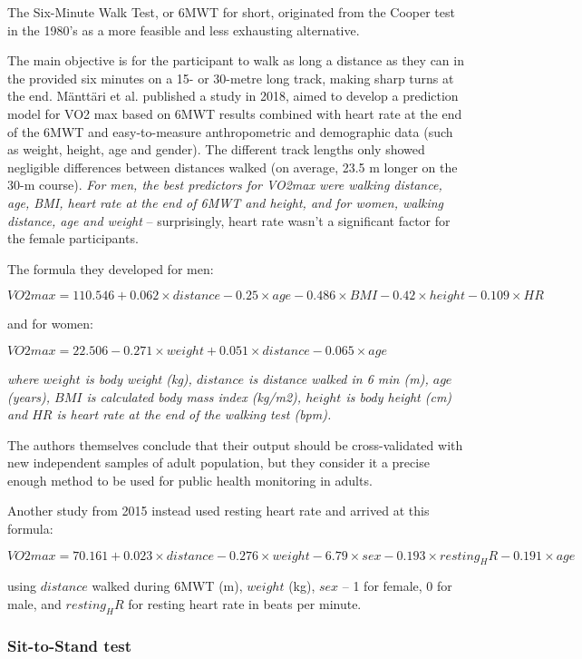 The Six-Minute Walk Test, or 6MWT for short, originated from the Cooper test in the 1980's as a more feasible and less exhausting alternative.\cite{6mwt-history}

The main objective is for the participant to walk as long a distance as they can in the provided six minutes on a 15- or 30-metre long track, making sharp turns at the end.
Mänttäri et al. published a study in 2018\cite{6min-walk-test-mantarri}, aimed to develop a prediction model for VO2 max based on 6MWT results combined with heart rate at the end of the 6MWT and easy-to-measure anthropometric and demographic data (such as weight, height, age and gender).
The different track lengths only showed negligible differences between distances walked (on average, 23.5 m longer on the 30-m course).
\textit{For men, the best predictors for VO2max were walking distance, age, BMI, heart rate at the end of 6MWT and height, and for women, walking distance, age and weight} -- surprisingly, heart rate wasn't a significant factor for the female participants.

The formula they developed for men:

 $VO2 max=110.546 + 0.062\times distance - 0.25\times age - 0.486\times BMI - 0.42\times height - 0.109\times HR$

 and for women:

 $VO2 max=22.506 - 0.271\times weight + 0.051\times distance - 0.065\times age$

 \textit{where $weight$ is body weight (kg), $distance$ is distance walked in 6 min (m), $age$ (years), $BMI$ is calculated body mass index (kg/m2), $height$ is body height (cm) and $HR$ is heart rate at the end of the walking test (bpm).}

The authors themselves conclude that their output should be cross-validated with new independent samples of adult population,
but they consider it a precise enough method to be used for public health monitoring in adults.

Another study from 2015\cite{6min-walk-test-burr} instead used resting heart rate and arrived at this formula:

$VO2 max =70.161 + 0.023 \times distance - 0.276 \times weight - 6.79 \times sex - 0.193 \times resting_HR - 0.191 \times age$

using $distance$ walked during 6MWT (m), $weight$ (kg), $sex$ -- 1 for female, 0 for male, and $resting_HR$ for resting heart rate in beats per minute.

\subsubsection*{Sit-to-Stand test}


